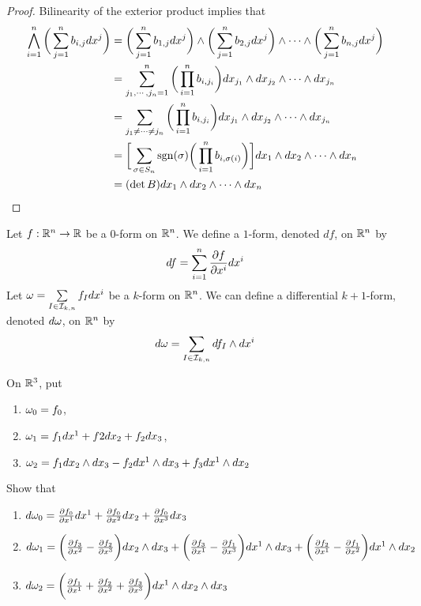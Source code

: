 \documentclass{book}
\begin{document}
	\begin{proof}
		Bilinearity of the exterior product implies that
		\begin{align*}
			\bigwedge_{i=1}^n \bigg(\sum_{j=1}^n b_{i,j}dx^j\bigg)
			 &=\bigg(\sum_{j=1}^n b_{1,j}dx^j\bigg) \wedge \bigg(\sum_{j=1}^n b_{2,j}dx^j\bigg) \wedge \cdots \wedge \bigg(\sum_{j=1}^n b_{n,j}dx^j\bigg) \\
			 &= \sum_{j_1, \cdots, j_n = 1}^n \bigg( \prod_{i=1}^n b_{i, j_i} \bigg) dx_{j_1}\wedge  dx_{j_2} \wedge \cdots \wedge  dx_{j_n} \\
			 &= \sum_{j_1 \neq \cdots \neq j_n} \bigg( \prod_{i=1}^n b_{i, j_i} \bigg) dx_{j_1}\wedge  dx_{j_2} \wedge \cdots \wedge  dx_{j_n} \\
			 &= \bigg[ \sum_{\sigma \in S_n} \operatorname{sgn}(\sigma) \bigg(\prod_{i=1}^n b_{i, \sigma(i)} \bigg) \bigg] dx_{1}\wedge  dx_{2} \wedge \cdots \wedge  dx_{n} \\
			 &= (\det B) dx_{1}\wedge  dx_{2} \wedge \cdots \wedge  dx_{n}
		\end{align*} 
		
	\end{proof}

	\begin{defn}
		Let $f: \mathbb{R}^n \rightarrow \mathbb{R}$ be a $0$-form on $\mathbb{R}^n$. We define a $1$-form, denoted $df$, on $\mathbb{R}^n$ by $$df = \sum_{i = 1}^n \frac{\partial f}{\partial x^i} dx^i$$
		Let $\omega = \sum\limits_{I \in \mathcal{I}_{k,n}} f_Idx^i$ be a $k$-form on $\mathbb{R}^n$. We can define a differential $k+1$-form, denoted $d \omega$, on $\mathbb{R}^n$ by $$d\omega = \sum\limits_{I \in \mathcal{I}_{k,n}} df_I\wedge dx^i$$  
	\end{defn}

	\begin{ex}
		On $\mathbb{R}^3$, put 
		\begin{enumerate}
			\item $\omega_0 = f_0$, 
			\item $\omega_1 = f_1 dx^1 + f2 dx_2 + f_2 dx_3$, 
			\item $\omega_2 = f_1dx_2\wedge dx_3 - f_2 dx^1 \wedge dx_3 + f_3 dx^1 \wedge dx_2$
		\end{enumerate} 
		Show that
		\begin{enumerate}
			\item $d\omega_0 = \frac{\partial f_0}{\partial x^1}dx^1 + \frac{\partial f_0}{\partial x^2}dx_2 + \frac{\partial f_0}{\partial x^3}dx_3$
			\item $d \omega_1 = \bigg(\frac{\partial f_3}{\partial x^2} - \frac{\partial f_2}{\partial x^3} \bigg) dx_2 \wedge dx_3 + \bigg( \frac{\partial f_3}{\partial x^1} - \frac{\partial f_1}{\partial x^3}\bigg)dx^1 \wedge dx_3 + \bigg( \frac{\partial f_2}{\partial x^1} - \frac{\partial f_1}{\partial x^2} \bigg) dx^1 \wedge dx_2$
			\item $d \omega_2 = \bigg( \frac{\partial f_1}{\partial x^1} + \frac{\partial f_2}{\partial x^2} + \frac{\partial f_3}{\partial x^3} \bigg) dx^1 \wedge dx_2 \wedge dx_3$ 
		\end{enumerate}
	\end{ex}
\end{document}
